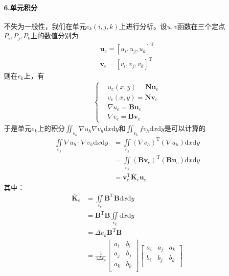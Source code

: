             \paragraph{6.单元积分}
            不失为一般性，我们在单元$e_k(i,j,k)$上进行分析。设$u,v$函数在三个定点$P_i,P_j,P_k$上的数值分别为
            \begin{align*}
                \mathbf{u}_e = [u_i,u_j,u_k]^\mathrm{T}\\
                \mathbf{v}_e = [v_i,v_j,v_k]^\mathrm{T}
            \end{align*}
            则在$e_k$上，有
            \begin{align*}
                \left\{
                \begin{aligned}
                    &u_e(x,y) = \mathbf{N} \mathbf{u}_e\\
                    &v_e(x,y) = \mathbf{N} \mathbf{v}_e\\
                    &\nabla u_e = \mathbf{B} \mathbf{u}_e\\
                    &\nabla v_e = \mathbf{B} \mathbf{v}_e
                \end{aligned}
                \right.
            \end{align*}
            于是单元$e_k$上的积分$\iint_{e_k} \nabla u_h \nabla v_h \mathrm{d}x\mathrm{d}y$和$\iint_{e_k} f v_h \mathrm{d}x\mathrm{d}y$是可以计算的
            \begin{align*}
                \iint\limits_{e_k} \nabla u_h \cdot \nabla v_h \mathrm{d}x\mathrm{d}y
                &=\iint\limits_{e_k} (\nabla v_h)^\mathrm{T} (\nabla u_h ) \mathrm{d}x\mathrm{d}y\\
                &=\iint\limits_{e_k} (\mathbf{B} \mathbf{v}_e)^\mathrm{T} (\mathbf{B} \mathbf{u}_e) \mathrm{d}x\mathrm{d}y\\
                & = \mathbf{v}_e^\mathrm{T} \overline{\mathbf{K}}_e \mathbf{u}_e
            \end{align*}
            其中：
            \begin{align*}
                \overline{\mathbf{K}}_e &= \iint\limits_{e_k} \mathbf{B}^\mathrm{T} \mathbf{B} \mathrm{d}x\mathrm{d}y \\
                &=\mathbf{B}^\mathrm{T} \mathbf{B} \iint\limits_{e_k} \mathrm{d}x\mathrm{d}y \\
                &=\Delta e_k\mathbf{B}^\mathrm{T} \mathbf{B}\\
                &=\frac{1}{4 \Delta e_k}
                    \begin{bmatrix}
                        a_i & b_i\\
                        a_j & b_j\\
                        a_k & b_k\\
                    \end{bmatrix}
                    \begin{bmatrix}
                        a_i & a_j & a_k\\
                        b_i & b_j & b_k\\
                    \end{bmatrix}
            \end{align*}
